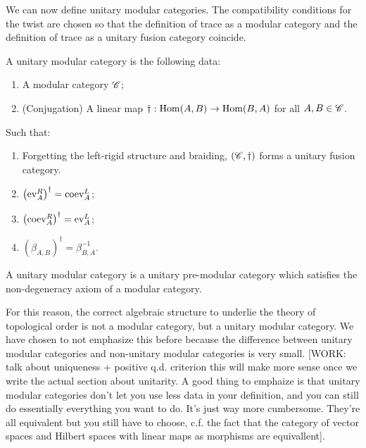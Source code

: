 We can now define unitary modular categories. The compatibility conditions for the twist are chosen so that the definition of trace as a modular category and the definition of trace as a unitary fusion category coincide.

\begin{definition} A unitary modular category is the following data:

\begin{enumerate}
\item A modular category $\mathscr{C}$;
\item (Conjugation) A linear map $\dagger: \operatorname{Hom}(A,B)\to \operatorname{Hom}(B,A)$ for all $A,B\in \mathscr{C}$.
\end{enumerate}

Such that:

\begin{enumerate}
\item Forgetting the left-rigid structure and braiding, $\left(\mathscr{C},\dagger\right)$ forms a unitary fusion category.
\item $\left(\operatorname{ev}_{A}^R\right)^{\dagger}=\operatorname{coev}_{A}^L$;
\item $\left(\operatorname{coev}_{A}^R\right)^{\dagger}=\operatorname{ev}_{A}^L$;
\item $\left(\beta_{A,B}\right)^{\dagger}=\beta_{B,A}^{-1}$.
\end{enumerate}

\raggedleft\qedsymbol{}
\end{definition}

\begin{definition} A unitary modular category is a unitary pre-modular category which satisfies the non-degeneracy axiom of a modular category.
\end{definition}

For this reason, the correct algebraic structure to underlie the theory of topological order is not a modular category, but a unitary modular category. We have chosen to not emphasize this before because the difference between unitary modular categories and non-unitary modular categories is very small. [WORK: talk about uniqueness + positive q.d. criterion this will make more sense once we write the actual section about unitarity. A good thing to emphaize is that unitary modular categories don't let you use less data in your definition, and you can still do essentially everything you want to do. It's just way more cumbersome. They're all equivalent but you still have to choose, c.f. the fact that the category of vector spaces and Hilbert spaces with linear maps as morphisms are equivallent].

